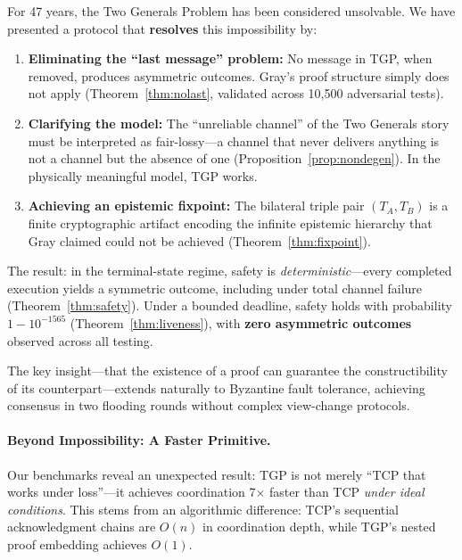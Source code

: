 
For 47 years, the Two Generals Problem has been considered unsolvable. We have presented a protocol that \textbf{resolves} this impossibility by:

\begin{enumerate}
    \item \textbf{Eliminating the ``last message'' problem:} No message in TGP, when removed, produces asymmetric outcomes. Gray's proof structure simply does not apply (Theorem~\ref{thm:nolast}, validated across 10,500 adversarial tests).

    \item \textbf{Clarifying the model:} The ``unreliable channel'' of the Two Generals story must be interpreted as fair-lossy---a channel that never delivers anything is not a channel but the absence of one (Proposition~\ref{prop:nondegen}). In the physically meaningful model, TGP works.

    \item \textbf{Achieving an epistemic fixpoint:} The bilateral triple pair $(T_A, T_B)$ is a finite cryptographic artifact encoding the infinite epistemic hierarchy that Gray claimed could not be achieved (Theorem~\ref{thm:fixpoint}).
\end{enumerate}

The result: in the terminal-state regime, safety is \emph{deterministic}---every completed execution yields a symmetric outcome, including under total channel failure (Theorem~\ref{thm:safety}). Under a bounded deadline, safety holds with probability $1 - 10^{-1565}$ (Theorem~\ref{thm:liveness}), with \textbf{zero asymmetric outcomes} observed across all testing.

The key insight---that the existence of a proof can guarantee the constructibility of its counterpart---extends naturally to Byzantine fault tolerance, achieving consensus in two flooding rounds without complex view-change protocols.

\paragraph{Beyond Impossibility: A Faster Primitive.}

Our benchmarks reveal an unexpected result: TGP is not merely ``TCP that works under loss''---it achieves coordination 7$\times$ faster than TCP \emph{under ideal conditions}. This stems from an algorithmic difference: TCP's sequential acknowledgment chains are $O(n)$ in coordination depth, while TGP's nested proof embedding achieves $O(1)$.

